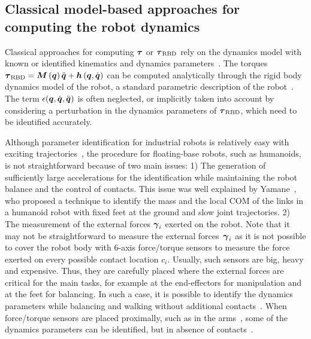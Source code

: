 \subsection{Classical model-based approaches for computing the robot dynamics}

Classical approaches for computing $\boldsymbol {\tau}$ or $\boldsymbol {\tau}_\text{RBD}$ rely on the dynamics model with known or identified kinematics and dynamics parameters~\cite{Ivaldi2014}. 
The torques $\boldsymbol {\tau}_\text{RBD} = \boldsymbol M \left( \boldsymbol q \right)\ddot{\boldsymbol q} + \boldsymbol h \left(\boldsymbol q,\dot{\boldsymbol q} \right)$ can be computed analytically through the rigid body dynamics model of the robot, a standard parametric description of the robot~\cite{Featherstone2008}. 
The term $\epsilon(\boldsymbol q,\dot{\boldsymbol q},\ddot{\boldsymbol q})$ is often neglected, or implicitly taken into account by considering a perturbation in the dynamics parameters of $\boldsymbol {\tau}_\text{RBD}$, which need to be identified accurately.







Although parameter identification for industrial robots is relatively easy with exciting trajectories~\cite{Pedrocchi2014}, the procedure for floating-base robots, such as humanoids, is not straightforward because of two main issues: 
1) The generation of sufficiently large accelerations for the identification while maintaining the robot balance and the control of contacts. 
This issue was well explained by Yamane~\cite{Yamane2011calibration}, who proposed a technique to identify the mass and the local COM of the links in a humanoid robot with fixed feet at the ground and slow joint trajectories. 
2) The measurement of the external forces $\boldsymbol {\gamma}_i$ exerted on the robot.
Note that it may not be straightforward to measure the external forces~$\boldsymbol {\gamma}_i$ as it is not possible to cover the robot body with 6-axis force/torque sensors to measure the force exerted on every possible contact location $c_i$. 
Usually, such sensors are big, heavy and expensive.
Thus, they are carefully placed where the external forces are critical for the main tasks, for example at the end-effectors for manipulation and at the feet for balancing.
In such a case, it is possible to identify the dynamics parameters while balancing and walking without additional contacts~\cite{Ogawa2014}.
When force/torque sensors are placed proximally, such as in the \robot{} arms~\cite{Fumagalli2012}, some of the dynamics parameters can be identified, but in absence of contacts~\cite{traversaro2013inertial}.

